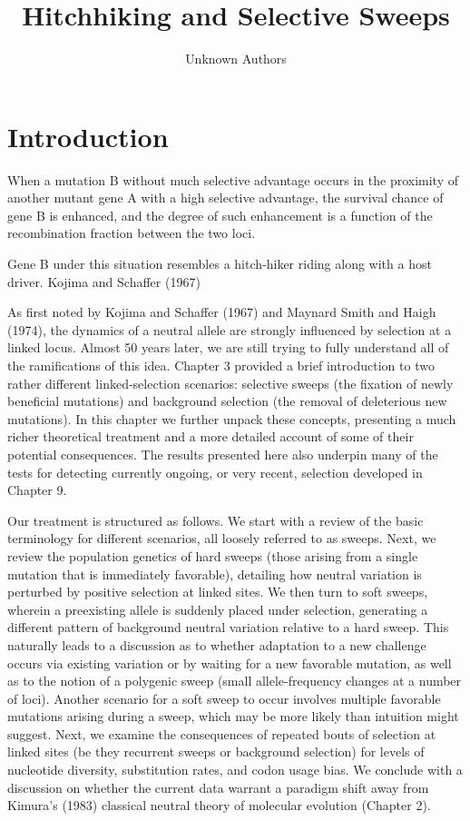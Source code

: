 \documentclass{article}
\title{Hitchhiking and Selective Sweeps}
\author{Unknown Authors}
\date{}
\begin{document}
\maketitle

\begin{abstract}

\end{abstract}

\section{Introduction}
When a mutation B without much selective advantage occurs in the proximity of another mutant gene A with a high selective advantage, the survival chance of gene B is enhanced, and the degree of such enhancement is a function of the recombination fraction between the two loci.

Gene B under this situation resembles a hitch-hiker riding along with a host driver.
Kojima and Schaffer (1967)

As first noted by Kojima and Schaffer (1967) and Maynard Smith and Haigh (1974), the dynamics of a neutral allele are strongly influenced by selection at a linked locus. Almost 50 years later, we are still trying to fully understand all of the ramifications of this idea. Chapter 3 provided a brief introduction to two rather different linked-selection scenarios: selective sweeps (the fixation of newly beneficial mutations) and background selection (the removal of deleterious new mutations). In this chapter we further unpack these concepts, presenting a much richer theoretical treatment and a more detailed account of some of their potential consequences. The results presented here also underpin many of the tests for detecting currently ongoing, or very recent, selection developed in Chapter 9.

Our treatment is structured as follows. We start with a review of the basic terminology for different scenarios, all loosely referred to as sweeps. Next, we review the population genetics of hard sweeps (those arising from a single mutation that is immediately favorable), detailing how neutral variation is perturbed by positive selection at linked sites. We then turn to soft sweeps, wherein a preexisting allele is suddenly placed under selection, generating a different pattern of background neutral variation relative to a hard sweep. This naturally leads to a discussion as to whether adaptation to a new challenge occurs via existing variation or by waiting for a new favorable mutation, as well as to the notion of a polygenic sweep (small allele-frequency changes at a number of loci). Another scenario for a soft sweep to occur involves multiple favorable mutations arising during a sweep, which may be more likely than intuition might suggest. Next, we examine the consequences of repeated bouts of selection at linked sites (be they recurrent sweeps or background selection) for levels of nucleotide diversity, substitution rates, and codon usage bias. We conclude with a discussion on whether the current data warrant a paradigm shift away from Kimura's (1983) classical neutral theory of molecular evolution (Chapter 2).
\end{document}
